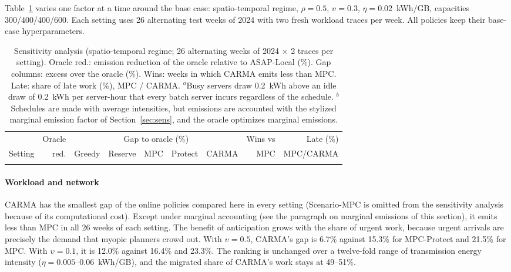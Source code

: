 Table~\ref{tab:sens} varies one factor at a time around the base case: spatio-temporal regime, $\rho=0.5$, $\upsilon=0.3$, $\eta=0.02$~kWh/GB, capacities 300/400/400/600. Each setting uses 26 alternating test weeks of 2024 with two fresh workload traces per week. All policies keep their base-case hyperparameters.

\begin{table}
\centering
\caption{Sensitivity analysis (spatio-temporal regime; 26 alternating weeks of 2024 $\times$ 2 traces per setting). Oracle red.: emission reduction of the oracle relative to ASAP-Local (\%). Gap columns: excess over the oracle (\%). Wins: weeks in which CARMA emits less than MPC. Late: share of late work (\%), MPC / CARMA. $^{a}$Busy servers draw 0.2~kWh above an idle draw of 0.2~kWh per server-hour that every batch server incurs regardless of the schedule. $^{b}$Schedules are made with average intensities, but emissions are accounted with the stylized marginal emission factor of Section~\ref{sec:sens}, and the oracle optimizes marginal emissions.}
\label{tab:sens}
\footnotesize\setlength{\tabcolsep}{3pt}
\begin{tabular}{lrrrrrrrr}
\toprule
 & Oracle & \multicolumn{5}{c}{Gap to oracle (\%)} & Wins vs & Late (\%) \\
\cmidrule(lr){3-7}
Setting & red. & Greedy & Reserve & MPC & Protect & CARMA & MPC & MPC/CARMA \\
\midrule
{}{table_sens.tex}
\bottomrule
\end{tabular}
\end{table}

\paragraph{Workload and network} CARMA has the smallest gap of the online policies compared here in every setting (Scenario-MPC is omitted from the sensitivity analysis because of its computational cost). Except under marginal accounting (see the paragraph on marginal emissions of this section), it emits less than MPC in all 26 weeks of each setting. The benefit of anticipation grows with the share of urgent work, because urgent arrivals are precisely the demand that myopic planners crowd out. With $\upsilon=0.5$, CARMA's gap is 6.7\% against 15.3\% for MPC-Protect and 21.5\% for MPC. With $\upsilon=0.1$, it is 12.0\% against 16.4\% and 23.3\%. The ranking is unchanged over a twelve-fold range of transmission energy intensity ($\eta=0.005$--$0.06$~kWh/GB), and the migrated share of CARMA's work stays at 49--51\%.

